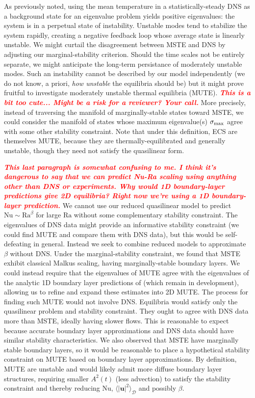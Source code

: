 \documentclass[reprint,amsmath,amssymb,aps]{revtex4-1}
\newcommand{\note}[1]{\noindent \textbf{\textit{\textcolor{Red}{#1}}}}
\newcommand\Ra{\mathrm{Ra}}
\newcommand\Nu{\mathrm{Nu}}
\renewcommand{\vec}[1]{\boldsymbol{#1}}
\begin{document}
As previously noted, using the mean temperature in a statistically-steady DNS as a background state for an eigenvalue problem yields positive eigenvalues: the system is in a perpetual state of instability. 
Unstable modes tend to stabilize the system rapidly, creating a negative feedback loop whose average state is linearly unstable. 
We might curtail the disagreement between MSTE and DNS by adjusting our marginal-stability criterion. 
Should the time scales not be entirely separate, we might anticipate the long-term persistance of moderately unstable modes. 
Such an instability cannot be described by our model independently (we do not know, a priori, \textit{how unstable} the equilibria should be) but it might prove fruitful to investigate moderately unstable thermal equilibria (MUTE). \note{This is a bit too cute... Might be a risk for a reviewer? Your call.}
More precisely, instead of traversing the manifold of marginally-stable states toward MSTE, we could consider the manifold of states whose maximum eigenvalue(s) $\sigma_{\rm{max}}$ agree with some other stability constraint. 
Note that under this definition, ECS are themselves MUTE, because they are thermally-equilibrated and generally unstable, though they need not satisfy the quasilinear form.

\note{This last paragraph is somewhat confusing to me. I think it's dangerous to say that we can predict Nu-Ra scaling using anything other than DNS or experiments. Why would 1D boundary-layer predictions give 2D equilibria? Right now we're using a 1D boundary-layer prediction.}
We cannot use our reduced quasilinear model to predict $\Nu \sim\Ra^{\beta}$ for large $\Ra$ without some complementary stability constraint. 
The eigenvalues of DNS data might provide an informative stability constraint (we could find MUTE and compare them with DNS data), but this would be self-defeating in general. 
Instead we seek to combine reduced models to approximate $\beta$ without DNS. Under the marginal-stability constraint, we found that MSTE exhibit classical Malkus scaling, having marginally-stable boundary layers. 
We could instead require that the eigenvalues of MUTE agree with the eigenvalues of the analytic 1D boundary layer predictions of \cite{Shishkina, Zhang_20} (which remain in development), allowing us to refine and expand these estimates into 2D MUTE. 
The process for finding such MUTE would not involve DNS. Equilibria would satisfy only the quasilinear problem and stability constraint. 
They ought to agree with DNS data more than MSTE, ideally having slower flows. 
This is reasonable to expect because accurate boundary layer approximations and DNS data should have similar stability characteristics. 
We also observed that MSTE have marginally stable boundary layers, so it would be reasonable to place a hypothetical stability constraint on MUTE based on boundary layer approximations.
By definition, MUTE are unstable and would likely admit more diffuse boundary layer structures, requiring smaller $A^2(t)$ (less advection) to satisfy the stability constraint and thereby reducing $\Nu$, $\langle |\vec{u}|^2 \rangle_{\mathcal{D}}$ and possibly $\beta$.
\end{document}
